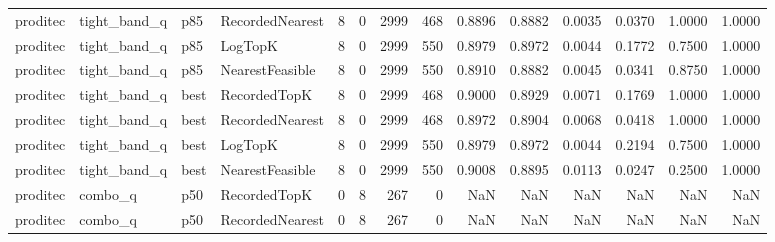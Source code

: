 \begin{tabular}{llllrrrrrrrrrr}
proditec &         tight\_band\_q &    p85 & RecordedNearest &           8 &          0 &           2999 &                 468 &         0.8896 &          0.8882 &                    0.0035 &         0.0370 &                 1.0000 &                  1.0000 \\
proditec &         tight\_band\_q &    p85 &         LogTopK &           8 &          0 &           2999 &                 550 &         0.8979 &          0.8972 &                    0.0044 &         0.1772 &                 0.7500 &                  1.0000 \\
proditec &         tight\_band\_q &    p85 & NearestFeasible &           8 &          0 &           2999 &                 550 &         0.8910 &          0.8882 &                    0.0045 &         0.0341 &                 0.8750 &                  1.0000 \\
proditec &         tight\_band\_q &   best &    RecordedTopK &           8 &          0 &           2999 &                 468 &         0.9000 &          0.8929 &                    0.0071 &         0.1769 &                 1.0000 &                  1.0000 \\
proditec &         tight\_band\_q &   best & RecordedNearest &           8 &          0 &           2999 &                 468 &         0.8972 &          0.8904 &                    0.0068 &         0.0418 &                 1.0000 &                  1.0000 \\
proditec &         tight\_band\_q &   best &         LogTopK &           8 &          0 &           2999 &                 550 &         0.8979 &          0.8972 &                    0.0044 &         0.2194 &                 0.7500 &                  1.0000 \\
proditec &         tight\_band\_q &   best & NearestFeasible &           8 &          0 &           2999 &                 550 &         0.9008 &          0.8895 &                    0.0113 &         0.0247 &                 0.2500 &                  1.0000 \\
proditec &              combo\_q &    p50 &    RecordedTopK &           0 &          8 &            267 &                   0 &            NaN &             NaN &                       NaN &            NaN &                    NaN &                     NaN \\
proditec &              combo\_q &    p50 & RecordedNearest &           0 &          8 &            267 &                   0 &            NaN &             NaN &                       NaN &            NaN &                    NaN &                     NaN \\

\end{tabular}
